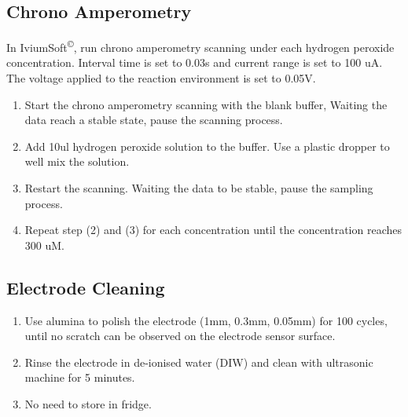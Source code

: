 \begin{appendices}
\subsection{Chrono Amperometry}
In IviumSoft\textsuperscript{\copyright}, run chrono amperometry scanning under each hydrogen peroxide concentration. Interval time is set to 0.03s and current range is set to 100 uA. The voltage applied to the reaction environment is set to 0.05V.

\begin{enumerate}
    \item Start the chrono amperometry scanning with the blank buffer, Waiting the data reach a stable state, pause the scanning process. 
    \item Add 10ul hydrogen peroxide solution to the buffer. Use a plastic dropper to well mix the solution.
    \item Restart the scanning. Waiting the data to be stable, pause the sampling process. 
    \item Repeat step (2) and (3) for each concentration until the concentration reaches 300 uM.
\end{enumerate} 
\subsection{Electrode Cleaning}
\begin{enumerate}
    \item Use alumina to polish the electrode (1mm, 0.3mm, 0.05mm) for 100 cycles, until no scratch can be observed on the electrode sensor surface.
    \item Rinse the electrode in de-ionised water (DIW) and clean with ultrasonic machine for 5 minutes. 
    \item No need to store in fridge.
\end{enumerate}

\newpage

\end{appendices}
